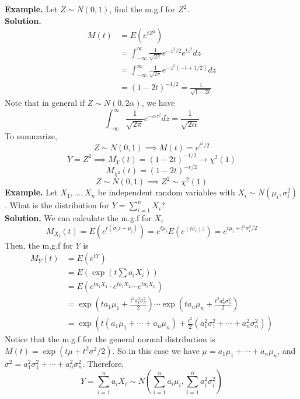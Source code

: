 \documentclass[openany]{report}
\begin{document}
\noindent
\textbf{Example.} Let $Z \sim N(0,1)$, find the m.g.f for $Z^2$. \\[2ex]
\textbf{Solution.}
\begin{align*}
    M(t) &= E(e^{tZ^2})\\
    &= \int_{-\infty}^\infty \frac{1}{\sqrt{2\pi}}e^{-z^2/2}e^{tz^2}dz\\
    &= \int_{-\infty}^\infty \frac{1}{\sqrt{2\pi}}e^{-z^2(-t + 1/2)}dz\\
    &= (1-2t)^{-1/2} = \frac{1}{\sqrt{1-2t}}
\end{align*}
Note that in general if $Z \sim N(0, 2\alpha)$, we have 
\[\int_{-\infty}^\infty \frac{1}{\sqrt{2\pi}}e^{-\alpha z^2}dz = \frac{1}{\sqrt{2\alpha}}\]
To summarize,
\[Z \sim N(0,1) \implies M(t) = e^{t^2/2}\]
\[Y = Z^2 \implies M_Y(t) = (1-2t)^{-1/2} \rightarrow \chi^2(1)\]
\[M_{\chi^2}(t) = (1-2t)^{-r/2}\]
\[Z \sim N(0,1) \implies Z^2 \sim \chi^2(1)\]
\noindent
\textbf{Example.}
Let $X_1, \ldots, X_n$ be independent random variables with $X_i \sim N(\mu_i, \sigma_i^2)$. What is the distribution for $Y = \sum\limits_{i=1}^n X_i$?\\[2ex]
\textbf{Solution.} 
We can calculate the m.g.f for $X_i$ 
\[M_{X_i}(t) = E(e^{t(\sigma_i z + \mu_i)}) = e^{t\mu_i} E(e^{(t\sigma_i)z}) = e^{t\mu_i + t^2\sigma_i^2/2} \]
Then, the m.g.f for $Y$ is
\begin{align*}
    M_Y(t) &= E(e^{tY})\\
    &= E \left(\exp\left(t\sum a_iX_i\right)\right)\\
    &= E(e^{ta_iX_1} \cdot e^{ta_iX_2} \cdots e^{ta_iX_n})\tag{Independence}\\
    &= \exp\left(ta_1\mu_1 + \frac{t^2a_1^2\sigma_n^2}{2}\right) \cdots \exp\left(ta_n\mu_n + \frac{t^2a_n^2\sigma_n^2}{2}\right)\\
    &= \exp\left(t(a_1\mu_1 + \cdots + a_n\mu_n) + \frac{t^2}{2}(a_1^2\sigma_1^2 + \cdots + a_n^2\sigma_n^2)\right)
\end{align*}
Notice that the m.g.f for the general normal distribution is $M(t) = \exp(t\mu + t^2\sigma^2/2)$. So in this case we have $\mu = a_1\mu_1 + \cdots + a_n\mu_n$, and $\sigma^2 = a_1^2\sigma_1^2 + \cdots + a_n^2\sigma_n^2$. Therefore, 
\[Y = \sum_{i=1}^n a_iX_i \sim N\left(\sum_{i=1}^n a_i\mu_i, \sum_{i=1}^n a_i^2\sigma_i^2\right)\]
\end{document}
